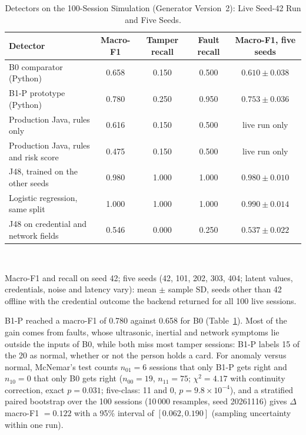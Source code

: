 \documentclass[journal,onecolumn]{IEEEtran}
\begin{document}
\begin{table}[!htbp]
\renewcommand{\arraystretch}{1.02}
\centering
\small
\caption{Detectors on the 100-Session Simulation (Generator Version~2): Live Seed-42 Run and Five Seeds.}
\label{tab:b0_vs_b1}
\vspace{2pt}
\begin{tabular}{l c c c c}
\hline
Detector & Macro-F1 & Tamper recall & Fault recall & Macro-F1, five seeds \\
\hline
\rule{0pt}{2.6ex}B0 comparator (Python) & 0.658 & 0.150 & 0.500 & $0.610\pm0.038$ \\
B1-P prototype (Python) & 0.780 & 0.250 & 0.950 & $0.753\pm0.036$ \\
Production Java, rules only & 0.616 & 0.150 & 0.500 & live run only \\
Production Java, rules and risk score & 0.475 & 0.150 & 0.500 & live run only \\
J48, trained on the other seeds & 0.980 & 1.000 & 1.000 & $0.980\pm0.010$ \\
Logistic regression, same split & 1.000 & 1.000 & 1.000 & $0.990\pm0.014$ \\
J48 on credential and network fields & 0.546 & 0.000 & 0.250 & $0.537\pm0.022$ \\
\hline
\end{tabular}
\\[2pt]
\parbox{0.92\linewidth}{\footnotesize Macro-F1 and recall on seed 42; five seeds (42, 101, 202, 303, 404; latent values, credentials, noise and latency vary): mean $\pm$ sample SD, seeds other than 42 offline with the credential outcome the backend returned for all 100 live sessions.}
\end{table}

B1-P reached a macro-F1 of 0.780 against 0.658 for B0 (Table~\ref{tab:b0_vs_b1}). Most of the gain comes from
faults, whose ultrasonic, inertial and network symptoms lie outside the inputs of B0, while both miss most tamper
sessions: B1-P labels 15 of the 20 as normal, whether or not the person holds a card. For anomaly versus normal, McNemar's test counts $n_{01}=6$ sessions that only B1-P gets right and $n_{10}=0$ that only B0 gets right
($n_{00}=19$, $n_{11}=75$; $\chi^2=4.17$ with continuity correction, exact $p=0.031$; five-class: 11 and 0,
$p=9.8\times10^{-4}$), and a stratified paired bootstrap over the 100 sessions (10\,000 resamples, seed 20261116)
gives $\Delta$macro-F1 $=0.122$ with a 95\% interval of $[0.062, 0.190]$ (sampling uncertainty within one run).
\end{document}
